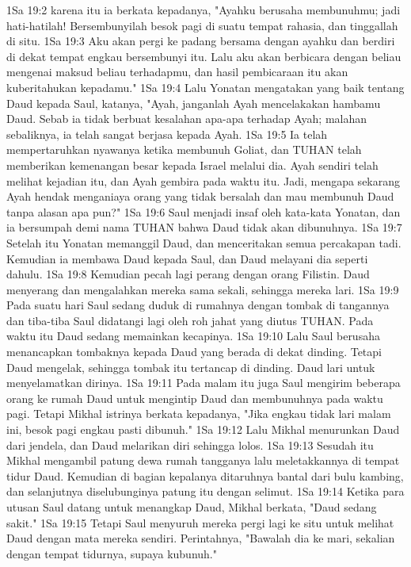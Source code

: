 1Sa 19:2  karena itu ia berkata kepadanya, "Ayahku berusaha membunuhmu; jadi hati-hatilah! Bersembunyilah besok pagi di suatu tempat rahasia, dan tinggallah di situ.
1Sa 19:3  Aku akan pergi ke padang bersama dengan ayahku dan berdiri di dekat tempat engkau bersembunyi itu. Lalu aku akan berbicara dengan beliau mengenai maksud beliau terhadapmu, dan hasil pembicaraan itu akan kuberitahukan kepadamu."
1Sa 19:4  Lalu Yonatan mengatakan yang baik tentang Daud kepada Saul, katanya, "Ayah, janganlah Ayah mencelakakan hambamu Daud. Sebab ia tidak berbuat kesalahan apa-apa terhadap Ayah; malahan sebaliknya, ia telah sangat berjasa kepada Ayah.
1Sa 19:5  Ia telah mempertaruhkan nyawanya ketika membunuh Goliat, dan TUHAN telah memberikan kemenangan besar kepada Israel melalui dia. Ayah sendiri telah melihat kejadian itu, dan Ayah gembira pada waktu itu. Jadi, mengapa sekarang Ayah hendak menganiaya orang yang tidak bersalah dan mau membunuh Daud tanpa alasan apa pun?"
1Sa 19:6  Saul menjadi insaf oleh kata-kata Yonatan, dan ia bersumpah demi nama TUHAN bahwa Daud tidak akan dibunuhnya.
1Sa 19:7  Setelah itu Yonatan memanggil Daud, dan menceritakan semua percakapan tadi. Kemudian ia membawa Daud kepada Saul, dan Daud melayani dia seperti dahulu.
1Sa 19:8  Kemudian pecah lagi perang dengan orang Filistin. Daud menyerang dan mengalahkan mereka sama sekali, sehingga mereka lari.
1Sa 19:9  Pada suatu hari Saul sedang duduk di rumahnya dengan tombak di tangannya dan tiba-tiba Saul didatangi lagi oleh roh jahat yang diutus TUHAN. Pada waktu itu Daud sedang memainkan kecapinya.
1Sa 19:10  Lalu Saul berusaha menancapkan tombaknya kepada Daud yang berada di dekat dinding. Tetapi Daud mengelak, sehingga tombak itu tertancap di dinding. Daud lari untuk menyelamatkan dirinya.
1Sa 19:11  Pada malam itu juga Saul mengirim beberapa orang ke rumah Daud untuk mengintip Daud dan membunuhnya pada waktu pagi. Tetapi Mikhal istrinya berkata kepadanya, "Jika engkau tidak lari malam ini, besok pagi engkau pasti dibunuh."
1Sa 19:12  Lalu Mikhal menurunkan Daud dari jendela, dan Daud melarikan diri sehingga lolos.
1Sa 19:13  Sesudah itu Mikhal mengambil patung dewa rumah tangganya lalu meletakkannya di tempat tidur Daud. Kemudian di bagian kepalanya ditaruhnya bantal dari bulu kambing, dan selanjutnya diselubunginya patung itu dengan selimut.
1Sa 19:14  Ketika para utusan Saul datang untuk menangkap Daud, Mikhal berkata, "Daud sedang sakit."
1Sa 19:15  Tetapi Saul menyuruh mereka pergi lagi ke situ untuk melihat Daud dengan mata mereka sendiri. Perintahnya, "Bawalah dia ke mari, sekalian dengan tempat tidurnya, supaya kubunuh."
